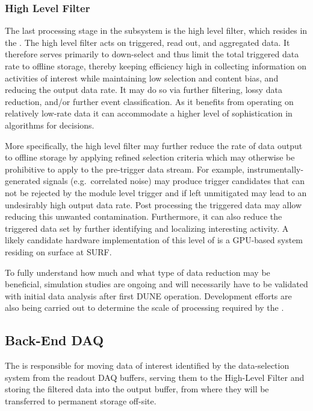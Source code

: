 \subsubsection{High Level Filter}
\label{sec:fd-daq:design-data-reduction}

The last processing stage in the  subsystem is the
high level filter, which resides in the .
The high level filter acts on triggered, read out, and aggregated data. 
It therefore serves primarily to down-select and thus
limit the total triggered data rate to offline storage, thereby keeping 
efficiency high in collecting information on activities of interest
while maintaining low selection and content bias, and reducing the output data
rate. It may do so via 
further filtering, lossy data reduction, and/or further event
classification.
As it benefits from operating on relatively low-rate data it can accommodate a higher level of
sophistication in algorithms for  decisions.

More specifically, the high level filter may further reduce the rate of data output to offline storage by
applying refined selection criteria which may otherwise be prohibitive
to apply to the pre-trigger data stream.  For example, instrumentally-generated signals (e.g.~correlated noise)
may produce trigger candidates that can not be rejected by the module
level trigger and if left unmitigated may lead to an undesirably high
output data rate. 
Post processing the triggered data may allow reducing this unwanted
contamination.
Furthermore, it can also reduce the triggered data set by further identifying
and localizing interesting activity. A likely candidate hardware
implementation of this level of  is a GPU-based system
residing on surface at SURF.

To fully understand how much and what type of data reduction may be
beneficial, simulation studies are ongoing \cite{bib:docdb11311} and will
necessarily have to be
validated with initial data analysis after
first DUNE  operation. Development efforts are also being
carried out to determine the scale of 
processing required by the .


\subsection{Back-End DAQ}
\label{sec:fd-daq:design-backend}

The   is responsible for moving data of interest identified by the data-selection system from the readout DAQ buffers, serving them to the High-Level Filter and storing the filtered data into the output buffer, from where they will be transferred to permanent storage off-site.

